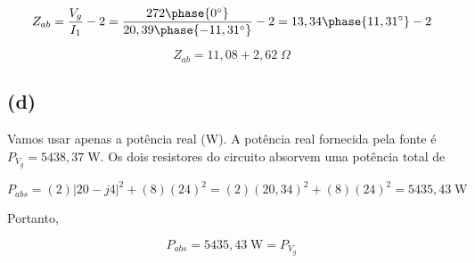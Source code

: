 \[ Z_{ab} = \frac{V_g}{I_1} - 2 = \frac{272\phase{0^{\circ}}}{20,39\phase{-11,31^{\circ}}} - 2 = 13,34\phase{11,31^{\circ}} - 2 \]

\[ \boxed{Z_{ab} = 11,08 + 2,62 \;\Omega} \]

\subsection*{(d)}

Vamos usar apenas a potência real (W). A potência real fornecida pela fonte é $P_{V_g} = 5438,37 \;\textrm{W}$. Os dois resistores
do circuito absorvem uma potência total de 

\[ P_{abs} = (2)|20 - j4|^2 + (8)(24)^2 = (2)(20,34)^2 + (8)(24)^2 = 5435,43 \;\textrm{W}  \]

Portanto, 

\[ \boxed{P_{abs} = 5435,43 \;\textrm{W} = P_{V_g}} \]









